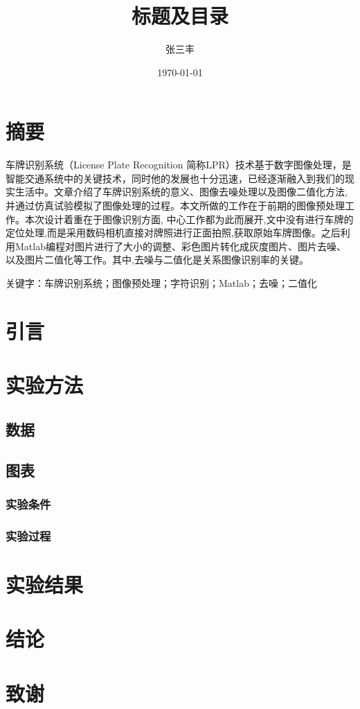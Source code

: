 \documentclass[12pt]{article}%
\title{标题及目录}
\author{张三丰}
\date{\today}
\begin{document}
	\maketitle
	\tableofcontents
	\section{摘要}
	车牌识别系统（License Plate Recognition 简称LPR）技术基于数字图像处理，是智能交通系统中的关键技术，同时他的发展也十分迅速，已经逐渐融入到我们的现实生活中。文章介绍了车牌识别系统的意义、图像去噪处理以及图像二值化方法,并通过仿真试验模拟了图像处理的过程。本文所做的工作在于前期的图像预处理工作。本次设计着重在于图像识别方面, 中心工作都为此而展开,文中没有进行车牌的定位处理,而是采用数码相机直接对牌照进行正面拍照,获取原始车牌图像。之后利用Matlab编程对图片进行了大小的调整、彩色图片转化成灰度图片、图片去噪、以及图片二值化等工作。其中,去噪与二值化是关系图像识别率的关键。
	
	关键字：车牌识别系统；图像预处理；字符识别；Matlab；去噪；二值化
	\section{引言}
	\section{实验方法}
		\subsection{数据}
		\subsection{图表}
			\subsubsection{实验条件}
			\subsubsection{实验过程}
	\section{实验结果}
	\section{结论}
	\section{致谢}
\end{document}

